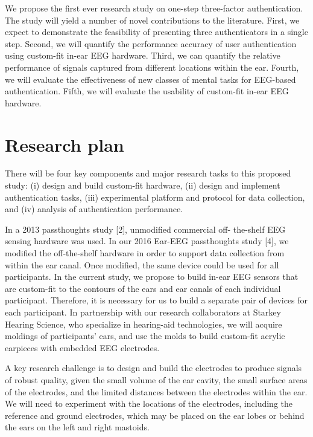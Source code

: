 \documentclass[11pt]{article}
\begin{document}
We propose the first ever research study on one-step three-factor authentication.
The study will yield a number of novel contributions to the literature. First, we
expect to demonstrate the feasibility of presenting three authenticators in a single
step. Second, we will quantify the performance accuracy of user authentication
using custom-fit in-ear EEG hardware. Third, we can quantify the relative
performance of signals captured from different locations within the ear. Fourth,
we will evaluate the effectiveness of new classes of mental tasks for EEG-based
authentication. Fifth, we will evaluate the usability of custom-fit in-ear EEG
hardware.

\section{Research plan}
\label{sec:orga31e397}

There will be four key components and major research tasks to this proposed
study: (i) design and build custom-fit hardware, (ii) design and implement
authentication tasks, (iii) experimental platform and protocol for data collection,
and (iv) analysis of authentication performance.

In a 2013 passthoughts study [2], unmodified commercial off-
the-shelf EEG sensing hardware was used. In our 2016 Ear-EEG passthoughts study [4],
we modified the off-the-shelf hardware in order to support data collection from
within the ear canal. Once modified, the same device could be used for all
participants. In the current study, we propose to build in-ear EEG sensors that
are custom-fit to the contours of the ears and ear canals of each individual
participant. Therefore, it is necessary for us to build a separate pair of devices for
each participant. In partnership with our research collaborators at Starkey
Hearing Science, who specialize in hearing-aid technologies, we will acquire
moldings of participants’ ears, and use the molds to build custom-fit acrylic
earpieces with embedded EEG electrodes.

A key research challenge is to design and build the electrodes to produce signals
of robust quality, given the small volume of the ear cavity, the small surface
areas of the electrodes, and the limited distances between the electrodes within
the ear. We will need to experiment with the locations of the electrodes, including
the reference and ground electrodes, which may be placed on the ear lobes or
behind the ears on the left and right mastoids.
\end{document}
